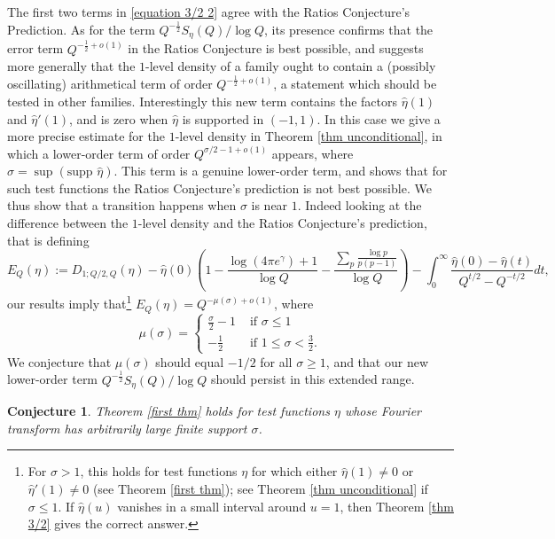 \documentclass[12pt,reqno]{amsart}
\numberwithin{equation}{section}
\theoremstyle{plain}
\newtheorem{conjecture}[thm]{Conjecture}
\begin{document}
The first two terms in \eqref{equation 3/2 2} agree with the Ratios Conjecture's Prediction. As for the term $Q^{-\frac 12}S_{\eta}(Q)/\log Q$,
its presence confirms that the error term $Q^{-\frac 12+o(1)}$ in the Ratios Conjecture is best possible, and suggests more generally that the $1$-level density of a family ought to contain a (possibly oscillating) arithmetical term of order $Q^{-\frac 12+o(1)}$, a statement which should be tested in other families. Interestingly this new term contains the factors $\hat{\eta}(1)$ and ${\widehat{\eta}}'(1)$, and is zero when $\widehat \eta$ is supported in $(-1,1)$. In this case we give a more precise estimate for the $1$-level density in Theorem \ref{thm unconditional}, in which a lower-order term of order $Q^{\sigma/2 -1 +o(1)}$ appears, where $\sigma= \sup(\text{supp } {\widehat{\eta}})$. This term is a genuine lower-order term, and shows that for such test functions the Ratios Conjecture's prediction is not best possible. We thus show that a transition happens when $\sigma$ is near $1$. Indeed looking at the difference between the $1$-level density and the Ratios Conjecture's prediction, that is defining \begin{equation} E_Q(\eta):= D_{1;Q/2,Q}(\eta)- \widehat{\eta}(0) \left( 1 -\frac{\log(4\pi e^{\gamma})+1}{\log Q} - \frac{\sum_p \frac{\log p}{p(p-1)} }{\log  Q}\right) - \int_0^{\infty}\frac{\widehat{\eta}(0) - \widehat{\eta}(t)}{Q^{t/2}-Q^{-t/2}} dt, \end{equation}
our results imply that\footnote{For $\sigma>1$, this holds for test functions $\eta$ for which either ${\widehat{\eta}}(1)\neq 0$ or ${\widehat{\eta}}'(1)\neq 0$ (see Theorem \ref{first thm}); see Theorem \ref{thm unconditional} if $\sigma \le 1$. If ${\widehat{\eta}}(u)$ vanishes in a small interval around $u=1$, then Theorem \ref{thm 3/2} gives the correct answer.} $E_Q(\eta)=Q^{-\mu(\sigma)+o(1)}$, where
\begin{equation} \mu(\sigma) = \begin{cases}
\frac{\sigma}2 -1 &\text{ if } \sigma \leq 1 \\
-\frac 12 & \text{ if } 1\leq \sigma < \frac 32.
\end{cases}\end{equation}
We conjecture that $\mu(\sigma)$ should equal $-1/2$ for all $\sigma \geq 1$, and that our new lower-order term $Q^{-\frac 12}S_{\eta}(Q)/\log Q $ should persist in this extended range.

\begin{conjecture}
Theorem \ref{first thm} holds for test functions $\eta$ whose Fourier transform has arbitrarily large finite support $\sigma$.
\label{conjecture all support}
\end{conjecture}
\end{document}
